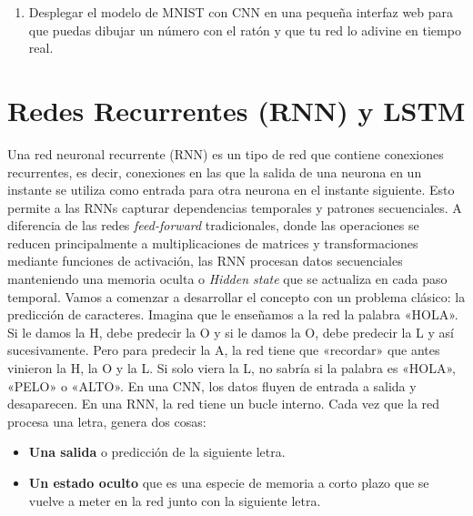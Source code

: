 \documentclass[a4paper,11pt]{article}
\begin{document}
\begin{enumerate}
\item Desplegar el modelo de MNIST con CNN en una pequeña interfaz web para que
  puedas dibujar un número con el ratón y que tu red lo adivine en tiempo real.


\end{enumerate}







\newpage
\section{Redes Recurrentes (RNN) y LSTM}

Una red neuronal recurrente (RNN) es un tipo de red que contiene conexiones
recurrentes, es decir, conexiones en las que la salida de una neurona en un
instante se utiliza como entrada para otra neurona en el instante
siguiente. Esto permite a las RNNs capturar dependencias temporales y patrones
secuenciales. A diferencia de las redes {\it feed-forward} tradicionales, donde
las operaciones se reducen principalmente a multiplicaciones de matrices y
transformaciones mediante funciones de activación, las RNN procesan datos
secuenciales manteniendo una memoria oculta o \emph{Hidden state} que se
actualiza en cada paso temporal. Vamos a comenzar a desarrollar el concepto con
un problema clásico: la predicción de caracteres. Imagina que le enseñamos a la
red la palabra «HOLA». Si le damos la H, debe predecir la O y si le damos la O,
debe predecir la L y así sucesivamente. Pero para predecir la A, la red tiene
que «recordar» que antes vinieron la H, la O y la L.  Si solo viera la L, no
sabría si la palabra es «HOLA», «PELO» o «ALTO».  En una CNN, los datos fluyen
de entrada a salida y desaparecen. En una RNN, la red tiene un bucle
interno. Cada vez que la red procesa una letra, genera dos cosas:

\begin{itemize}
\item
  \textbf{Una salida} o predicción de la siguiente letra.
\item
  \textbf{Un estado oculto} que es una especie de memoria a corto plazo
  que se vuelve a meter en la red junto con la siguiente letra.
\end{itemize}
\end{document}
